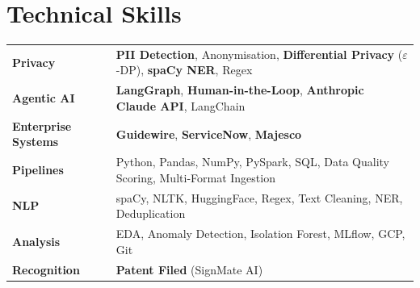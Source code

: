 \documentclass[10pt, letterpaper]{article}
\begin{document}
\section{Technical Skills}
\vspace{1pt}
\begin{tabularx}{\linewidth}{@{}lX@{}}
\textbf{Privacy}       & \textbf{PII Detection}, Anonymisation, \textbf{Differential Privacy} ($\varepsilon$-DP), \textbf{spaCy NER}, Regex \\[1.2pt]
\textbf{Agentic AI}    & \textbf{LangGraph}, \textbf{Human-in-the-Loop}, \textbf{Anthropic Claude API}, LangChain \\[1.2pt]
\textbf{Enterprise Systems} & \textbf{Guidewire}, \textbf{ServiceNow}, \textbf{Majesco} \\[1.2pt]
\textbf{Pipelines}     & Python, Pandas, NumPy, PySpark, SQL, Data Quality Scoring, Multi-Format Ingestion \\[1.2pt]
\textbf{NLP}           & spaCy, NLTK, HuggingFace, Regex, Text Cleaning, NER, Deduplication \\[1.2pt]
\textbf{Analysis}      & EDA, Anomaly Detection, Isolation Forest, MLflow, GCP, Git \\[1.2pt]
\textbf{Recognition}   & \textbf{Patent Filed} (SignMate AI) \\
\end{tabularx}
\end{document}
